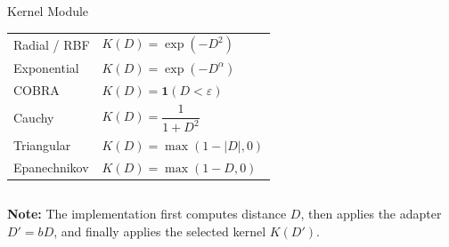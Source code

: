 \begin{frame}
\begin{columns}[T,onlytextwidth]
\begin{block}{Kernel Module}
\begin{tabularx}{\linewidth}{p{2.0cm} X}
                Radial / RBF
                                &
                \( K(D)=\exp(-D^2) \)                  \\

                Exponential
                                &
                \( K(D)=\exp(-D^\alpha) \)           \\

                COBRA
                                &
                \( K(D)=\mathbf{1}(D<\varepsilon) \) \\

                Cauchy
                                &
                \( K(D)=\dfrac{1}{1+D^2} \)            \\

                Triangular
                                &
                \( K(D)=\max(1-|D|,0) \)             \\

                Epanechnikov
                                &
                \( K(D)=\max(1-D,0) \)               \\

                \bottomrule
            \end{tabularx}
        \end{block}

    \end{columns}

    \vspace{0.10cm}

    {\tiny
        \textbf{Note:} The implementation first computes distance \(D\), then applies the adapter \(D'=bD\), and finally applies the selected kernel \(K(D')\).
    }
\end{frame}

